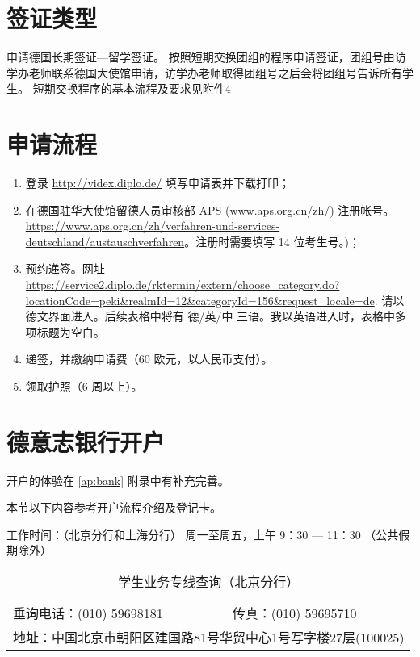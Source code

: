 
\section{签证类型}
申请德国长期签证---留学签证。 
按照短期交换团组的程序申请签证，团组号由访学办老师联系德国大使馆申请，访学办老师取得团组号之后会将团组号告诉所有学生。
短期交换程序的基本流程及要求见附件4

\section{申请流程}
\begin{enumerate}
\item 登录 \url{http://videx.diplo.de/} 填写申请表并下载打印；
\item \sloppy 在德国驻华大使馆留德人员审核部 APS (\url{www.aps.org.cn/zh/}) 注册帐号。\url{https://www.aps.org.cn/zh/verfahren-und-services-deutschland/austauschverfahren}。注册时需要填写 14 位考生号。)；
\item 预约递签。网址 \url{https://service2.diplo.de/rktermin/extern/choose_category.do?locationCode=peki&realmId=12&categoryId=156&request_locale=de}. 请以德文界面进入。后续表格中将有 德/英/中 三语。我以英语进入时，表格中多项标题为空白。 
\item 递签，并缴纳申请费（60 欧元，以人民币支付）。
\item 领取护照（6 周以上）。
\end{enumerate}

\section[德意志银行开户]{德意志银行开户}
开户的体验在 \ref{ap:bank} 附录中有补充完善。

本节以下内容参考\href{https://china.db.com/china/docs/Deutsche_Bank-China-Account-Opening-Process-And-Introduction.pdf}{开户流程介绍及登记卡}。

工作时间：（北京分行和上海分行） 周一至周五，上午 9：30 --- 11：30 （公共假期除外）

\begin{table*}[htbp]
\caption{学生业务专线查询（北京分行）}
\label{tb:bank-communication}
\centering
\begin{tabular}{ll}
  垂询电话：(010) 59698181 & 传真：(010) 59695710 \\
  \multicolumn{2}{l}{地址：中国北京市朝阳区建国路81号华贸中心1号写字楼27层(100025)}
\end{tabular}  
\end{table*}

